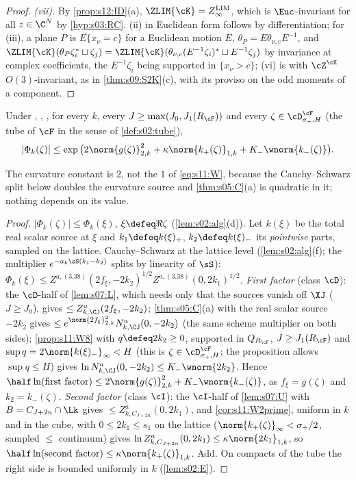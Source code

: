 \begin{proof}
\emph{(vii).} By \cref{prop:s12:ID}(a), $\ZLIM{\cK}=Z^{\mathrm{LIM}}_\infty$, which is $\Euc$-invariant for all $z\in\C^N$ by \cref{hyp:s03:RC}. (ii) in Euclidean form follows by differentiation; for (iii), a plane $P$ is $E\{x_\nu=c\}$ for a Euclidean motion $E$, $\theta_P=E\theta_{\nu,c}E^{-1}$, and $\ZLIM{\cK}(\theta_P\zeta^*_i\sqcup\zeta_j)=\ZLIM{\cK}(\theta_{\nu,c}(E^{-1}\zeta_i)^*\sqcup E^{-1}\zeta_j)$ by invariance at complex coefficients, the $E^{-1}\zeta_i$ being supported in $\{x_\nu>c\}$; (vi) is \cite[p:cor:rotcor]{SymPhase} with $\cZ^{\cK}$ $O(3)$-invariant, as in \cref{thm:s09:S2K}(c), with its proviso on the odd moments of a component.
\end{proof}

\begin{lemma}\label{lem:s12:claim4prime}
Under \Tthree, \Bcell, \SCH, for every $k$, every $J\ge\max(J_0,J_1(R_\cF))$ and every $\zeta\in\cD^{\cF}_{\sigma_+,H}$ (the tube of $\cF$ in the sense of \cref{def:s02:tube}),
\[
|\Phi_k(\zeta)|\le\exp\big(2\norm{g(\zeta)}^2_{2,k}+\kappa\norm{k_+(\zeta)}_{1,k}+K_-\wnorm{k_-(\zeta)}\big).
\]
\end{lemma}
The curvature constant is $2$, not the $1$ of \eqref{eq:s11:W}, because the Cauchy--Schwarz split below doubles the curvature source and \cref{thm:s05:C}(a) is quadratic in it; nothing depends on its value.

\begin{proof}
$|\Phi_k(\zeta)|\le\Phi_k(\xi)$, $\xi\defeq\Re\zeta$ (\cref{lem:s02:alg}(d)). Let $k(\xi)$ be the total real scalar source at $\xi$ and $k_1\defeq k(\xi)_+$, $k_2\defeq k(\xi)_-$ its \emph{pointwise} parts, sampled on the lattice. Cauchy--Schwarz at the lattice level (\cref{lem:s02:alg}(f); the multiplier $e^{-a_k\sS(k_1-k_2)}$ splits by linearity of $\sS$): $\Phi_k(\xi)\le Z^{a,(3.38)}(2f_\xi,-2k_2)^{1/2}Z^{a,(3.38)}(0,2k_1)^{1/2}$. \emph{First factor} (class $\cD$): the $\cD$-half of \cref{lem:s07:L}, which needs only that the sources vanish off $\XJ$ ($J\ge J_0$), gives $\le Z^a_{k,\CJ}(2f_\xi,-2k_2)$; \cref{thm:s05:C}(a) with the real scalar source $-2k_2$ gives $\le e^{\norm{2f_\xi}^2_{2,k}}N^a_{k,\CJ}(0,-2k_2)$ (the same scheme multiplier on both sides); \cref{prop:s11:W8} with $q\defeq2k_2\ge0$, supported in $Q_{R_\cF}$, $J\ge J_1(R_\cF)$ and $\sup q=2\norm{k(\xi)_-}_\infty<H$ (this is $\zeta\in\cD^\cF_{\sigma_+,H}$; the proposition allows $\sup q\le H$) gives $\ln N^a_{k,\CJ}(0,-2k_2)\le K_-\wnorm{2k_2}$. Hence $\half\ln(\text{first factor})\le2\norm{g(\zeta)}^2_{2,k}+K_-\wnorm{k_-(\zeta)}$, as $f_\xi=g(\zeta)$ and $k_2=k_-(\zeta)$. \emph{Second factor} (class $\cI$): the $\cI$-half of \cref{lem:s07:U} with $B=C_{J+2n}\cap\Lk$ gives $\le Z^a_{k,C_{J+2n}}(0,2k_1)$, and \cref{cor:s11:W2prime}, uniform in $k$ and in the cube, with $0\le2k_1\le s_1$ on the lattice ($\norm{k_+(\zeta)}_\infty<\sigma_+/2$, sampled $\le$ continuum) gives $\ln Z^a_{k,C_{J+2n}}(0,2k_1)\le\kappa\norm{2k_1}_{1,k}$, so $\half\ln(\text{second factor})\le\kappa\norm{k_+(\zeta)}_{1,k}$. Add. On compacts of the tube the right side is bounded uniformly in $k$ (\cref{lem:s02:E}).
\end{proof}


